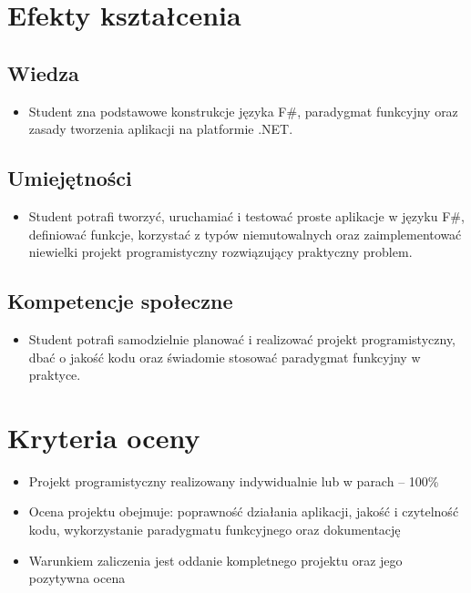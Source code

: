 \documentclass[12pt, a4paper]{article}
\begin{document}
\section{Efekty kształcenia}

\subsection*{Wiedza}
\begin{itemize}
  \item Student zna podstawowe konstrukcje języka F\#, paradygmat funkcyjny oraz zasady tworzenia aplikacji na platformie .NET.
\end{itemize}

\subsection*{Umiejętności}
\begin{itemize}
  \item Student potrafi tworzyć, uruchamiać i testować proste aplikacje w języku F\#, definiować funkcje, korzystać z typów niemutowalnych oraz zaimplementować niewielki projekt programistyczny rozwiązujący praktyczny problem.
\end{itemize}

\subsection*{Kompetencje społeczne}
\begin{itemize}
  \item Student potrafi samodzielnie planować i realizować projekt programistyczny, dbać o jakość kodu oraz świadomie stosować paradygmat funkcyjny w praktyce.
\end{itemize}

\section{Kryteria oceny}

\begin{itemize}
  \item Projekt programistyczny realizowany indywidualnie lub w parach – 100\%
  \item Ocena projektu obejmuje: poprawność działania aplikacji, jakość i czytelność kodu, wykorzystanie paradygmatu funkcyjnego oraz dokumentację
  \item Warunkiem zaliczenia jest oddanie kompletnego projektu oraz jego pozytywna ocena
\end{itemize}
\end{document}
